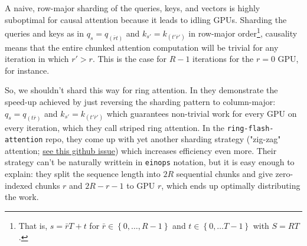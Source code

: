 A naive, row-major sharding of the queries, keys, and vectors is highly suboptimal for causal
attention because it leads to idling GPUs. Sharding the queries and keys as in $ q _{ s } =q _{
(\bar{r}t) } $ and $ k _{ s' } = k _{ (t'\bar{r}') } $ in row-major order\footnote{That is, $ s = \bar{r}T
+ t $ for $ \bar{r} \in \left \{ 0, \ldots , R-1 \right \} $ and $ t \in \left \{ 0, \ldots  T-1
\right \} $ with $ S=RT $.}, causality means that the entire chunked attention computation will be
trivial for any iteration in which $ r'> r $. This is the case for $ R-1 $ iterations for the $ r=0
$ GPU, for instance.

So, we shouldn't shard this way for ring attention. In \cite{brandon2023stripedattentionfasterring}
they demonstrate the speed-up achieved by just reversing the sharding pattern to column-major: $ q
_{ s } =q _{ (t\bar{r}) } $ and $ k _{ s' } = k _{ (t'\bar{r}') } $ which guarantees non-trivial
work for every GPU on every iteration, which they call striped ring attention. In the \texttt{ring-flash-attention} repo, they come up with
yet another sharding strategy ("zig-zag" attention;
\href{https://github.com/zhuzilin/ring-flash-attention/issues/2}{see this github issue}) which
increases efficiency even more. Their strategy can't be naturally writtein in \texttt{einops}
notation, but it is easy enough to explain: they split the sequence length into $ 2R $ sequential
chunks and give zero-indexed chunks $ r $ and $ 2R -r -1 $ to GPU $ r $, which ends up optimally
distributing the work.


